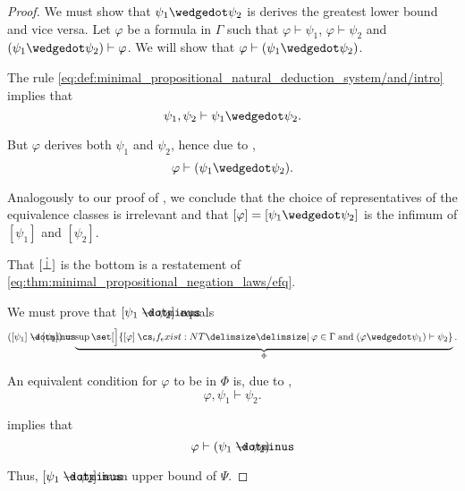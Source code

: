 \begin{proof}
  We must show that \( \psi_1 \synwedge \psi_2 \) is derives the greatest lower bound and vice versa. Let \( \varphi \) be a formula in \( \Gamma \) such that \( \varphi \vdash \psi_1 \), \( \varphi \vdash \psi_2 \) and \( (\psi_1 \synwedge \psi_2) \vdash \varphi \). We will show that \( \varphi \vdash (\psi_1 \synwedge \psi_2) \).

  The rule \eqref{eq:def:minimal_propositional_natural_deduction_system/and/intro} implies that
  \begin{equation*}
    \psi_1, \psi_2 \vdash \psi_1 \synwedge \psi_2.
  \end{equation*}

  But \( \varphi \) derives both \( \psi_1 \) and \( \psi_2 \), hence due to ,
  \begin{equation*}
    \varphi \vdash (\psi_1 \synwedge \psi_2).
  \end{equation*}

  Analogously to our proof of , we conclude that the choice of representatives of the equivalence classes is irrelevant and that \( [\varphi] = [\psi_1 \synwedge \psi_2] \) is the infimum of \( [\psi_1] \) and \( [\psi_2] \).

   That \( [\dot\bot] \) is the bottom is a restatement of \eqref{eq:thm:minimal_propositional_negation_laws/efq}.

   We must prove that \( [\psi_1 \synimplies \psi_2] \) equals
  \begin{equation*}
    ([\psi_1] \synimplies [\psi_2]) = \underbrace{\sup\set[\Big]{ [\varphi] \given* \varphi \in \Gamma \T{and} (\varphi \synwedge \psi_1) \vdash \psi_2 }}_{\Phi}.
  \end{equation*}

  An equivalent condition for \( \varphi \) to be in \( \Phi \) is, due to ,
  \begin{equation*}
    \varphi, \psi_1 \vdash \psi_2.
  \end{equation*}

   implies that
  \begin{equation*}
    \varphi \vdash (\psi_1 \synimplies \psi_2).
  \end{equation*}

  Thus, \( [\psi_1 \synimplies \psi_2] \) is an upper bound of \( \Psi \).


\end{proof}
